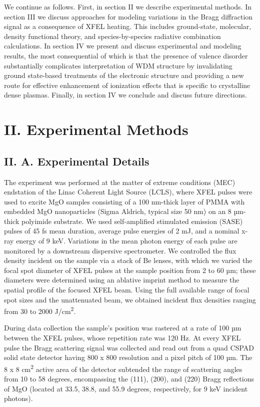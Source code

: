 We continue as follows. First, in section II we describe experimental
methods. In section III we discuss approaches for modeling variations in
the Bragg diffraction signal as a consequence of XFEL heating. This
includes ground-state, molecular, density functional theory, and
species-by-species radiative combination calculations. In section IV we
present and discuss experimental and modeling results, the most
consequential of which is that the presence of valence disorder
substantially complicates interpretation of WDM structure by
invalidating ground state-based treatments of the electronic structure
and providing a new route for effective enhancement of ionization
effects that is specific to crystalline dense plasmas. Finally, in
section IV we conclude and discuss future directions.

\section{II. Experimental Methods}

\subsection{II. A. Experimental Details}

The experiment was performed at the matter of extreme conditions (MEC)
endstation of the Linac Coherent Light Source (LCLS), where XFEL pulses
were used to excite MgO samples consisting of a 100 nm-thick layer of
PMMA with embedded MgO nanoparticles (Sigma Aldrich, typical size 50 nm)
on an 8 µm-thick polyimide substrate. We used self-amplified stimulated
emission (SASE) pulses of 45 fs mean duration, average pulse energies of
2 mJ, and a nominal x-ray energy of 9 keV. Variations in the mean photon
energy of each pulse are monitored by a downstream dispersive
spectrometer. We controlled the flux density incident on the sample via
a stack of Be lenses, with which we varied the focal spot diameter of
XFEL pulses at the sample position from 2 to 60 µm; these diameters were
determined using an ablative imprint method to measure the spatial
profile of the focused XFEL beam.  Using the full available
range of focal spot sizes and the unattenuated beam, we obtained
incident flux densities ranging from 30 to 2000 J/cm\textsuperscript{2}.

During data collection the sample's position was rastered at a rate of
100 µm between the XFEL pulses, whose repetition rate was 120 Hz. At
every XFEL pulse the Bragg scattering signal was collected and read out
from a quad CSPAD solid state detector having 800 x 800 resolution and a
pixel pitch of 100 µm. \cite{hart2012cspad} The 8 x 8 cm\textsuperscript{2}
active area of the detector subtended the range of scattering angles
from 10 to 58 degrees, encompassing the (111), (200), and (220) Bragg
reflections of MgO (located at 33.5, 38.8, and 55.9 degrees,
respectively, for 9 keV incident photons).

